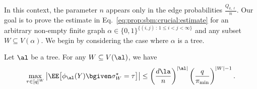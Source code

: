 \documentclass[11pt]{article}
\begin{document}
In this context, the parameter $n$ appears only in the edge probabilities $\frac{Q_{k,\ell}}{n}$. Our goal is to prove the estimate in Eq.~\eqref{eq:prop:sbm:crucial:estimate} for an arbitrary non-empty finite graph $\alpha \in \{0,1\}^{\{(i, j) \,:\, 1 \le i < j<\infty\}}$ and any subset $W \subseteq V(\alpha)$. We begin by considering the case where $\alpha$ is a tree.

\begin{lemma}\label{lem:sbm:crucial:estimate:tree}
Let $\al$ be a tree. For any $W\subseteq V(\al)$, we have
\begin{equation*}
\max_{\tau\in [q]^W}\left|\EE\big[\phi_{\al}(Y)\bgiven \sigma^\star_W=\tau\big]\right|\leq \left(\frac{d\la}{n}\right)^{|\al|}\left(\frac{q}{\pi_{\min}}\right)^{|W|-1}.
\end{equation*}
\end{lemma}
\end{document}
